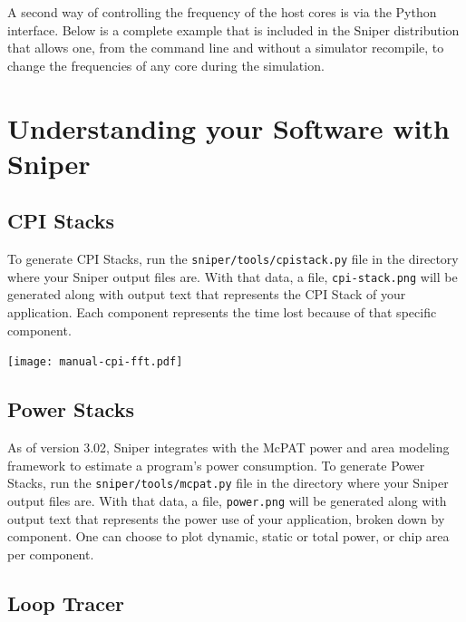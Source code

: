 \documentclass[a4paper,11pt,titlepage]{article}
\newcommand{\cmd}[1]{{\tt #1}}
\begin{document}
A second way of controlling the frequency of the host cores is via the Python interface.  Below is a complete example
that is included in the Sniper distribution that allows one, from the command line and without a simulator
recompile, to change the frequencies of any core during the simulation.




\section{Understanding your Software with Sniper}

\subsection{CPI Stacks}

\begin{minipage}{0.5\linewidth}

To generate CPI Stacks, run the \cmd{sniper/tools/cpistack.py} file in the
directory where your Sniper output files are.  With that data, a file,
\cmd{cpi-stack.png} will be generated along with output text that represents
the CPI Stack of your application.  Each component represents the time lost
because of that specific component.

\end{minipage}\hfill
\begin{minipage}{0.5\linewidth}
  \centering
  \texttt{[image: manual-cpi-fft.pdf]}
\end{minipage}\hfill


\subsection{Power Stacks}

As of version 3.02, Sniper integrates with the McPAT power and area modeling framework
to estimate a program's power consumption.
To generate Power Stacks, run the \cmd{sniper/tools/mcpat.py} file in the
directory where your Sniper output files are.  With that data, a file,
\cmd{power.png} will be generated along with output text that represents
the power use of your application, broken down by component.
One can choose to plot dynamic, static or total power, or chip area per component.


\subsection{Loop Tracer}
\end{document}
